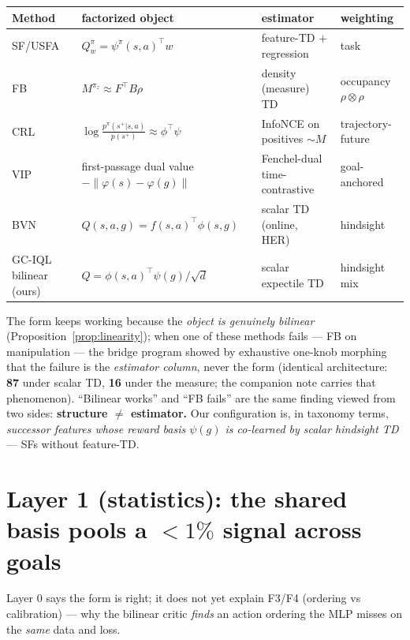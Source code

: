 \documentclass[11pt]{article}
\newcommand{\numgood}[1]{\textbf{\textcolor{green!45!black}{#1}}}
\newcommand{\numbad}[1]{\textbf{\textcolor{red!65!black}{#1}}}
\theoremstyle{definition}
\theoremstyle{remark}
\begin{document}
\begin{center}\footnotesize
\renewcommand{\arraystretch}{1.25}
\setlength{\tabcolsep}{4pt}
\begin{tabular}{@{}l l l l@{}}
\toprule
Method & factorized object & estimator & weighting \\
\midrule
SF/USFA & $Q^\pi_w=\psi^\pi(s,a)^\top w$ & feature-TD $+$ regression & task \\
FB & $M^{\pi_z}\approx F^\top B\rho$ & density (measure) TD & occupancy $\rho\otimes\rho$ \\
CRL & $\log\frac{p^{\pi}(s^+|s,a)}{p(s^+)}\approx\phi^\top\psi$ & InfoNCE on positives
$\sim M$ & trajectory-future \\
VIP & first-passage dual value $-\|\varphi(s){-}\varphi(g)\|$ & Fenchel-dual
time-contrastive & goal-anchored \\
BVN & $Q(s,a,g)=f(s,a)^\top\phi(s,g)$ & scalar TD (online, HER) & hindsight \\
GC-IQL bilinear (ours) & $Q=\phi(s,a)^\top\psi(g)/\sqrt d$ & scalar expectile TD &
hindsight mix \\
\bottomrule
\end{tabular}
\end{center}

\noindent The form keeps working because the \emph{object is genuinely bilinear}
(Proposition~\ref{prop:linearity}); when one of these methods fails --- FB on manipulation
--- the bridge program showed by exhaustive one-knob morphing that the failure is the
\emph{estimator column}, never the form (identical architecture: \numgood{87} under scalar
TD, \numbad{16} under the measure; the companion note carries that phenomenon). ``Bilinear
works'' and ``FB fails'' are the same finding viewed from two sides: \textbf{structure
$\neq$ estimator.} Our configuration is, in taxonomy terms, \emph{successor features whose
reward basis $\psi(g)$ is co-learned by scalar hindsight TD} --- SFs without feature-TD.

\section{Layer 1 (statistics): the shared basis pools a $<\!1\%$ signal across goals}
\label{sec:layer1}

Layer 0 says the form is right; it does not yet explain F3/F4 (ordering vs calibration) ---
why the bilinear critic \emph{finds} an action ordering the MLP misses on the \emph{same}
data and loss.
\end{document}

